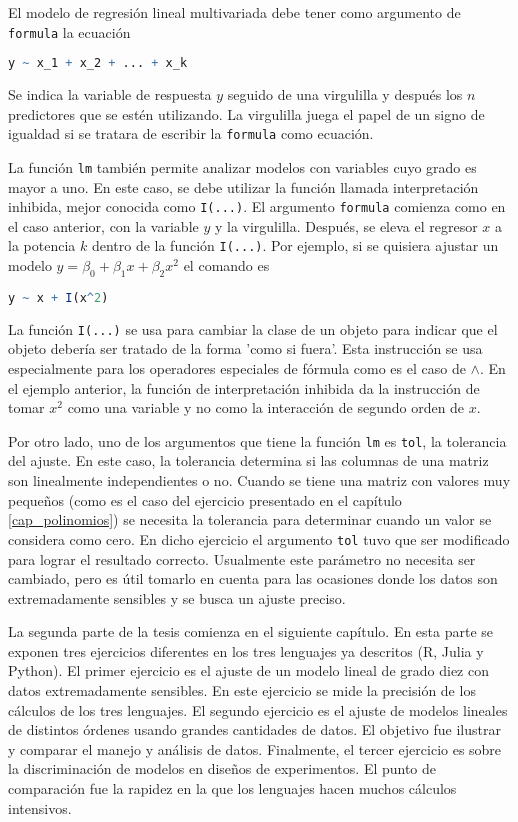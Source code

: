 El modelo de regresión lineal multivariada debe tener como argumento de \texttt{formula} la ecuación 

\begin{lstlisting}[language=R]
	y ~ x_1 + x_2 + ... + x_k
\end{lstlisting}

Se indica la variable de respuesta $y$ seguido de una virgulilla y después los $n$ predictores que se estén utilizando. La virgulilla juega el papel de un signo de igualdad si se tratara de escribir la \texttt{formula} como ecuación.

La función \texttt{lm} también permite analizar modelos con variables cuyo grado es mayor a uno. En este caso, se debe utilizar la función llamada interpretación inhibida, mejor conocida como \texttt{I(...)}. El argumento \texttt{formula} comienza como en el caso anterior, con la variable $y$ y la virgulilla. Después, se eleva el regresor $x$ a la potencia $k$ dentro de la función \texttt{I(...)}. Por ejemplo, si se quisiera ajustar un modelo  $y = \beta_0 + \beta_1 x + \beta_2 x^{2}$ el comando es

\begin{lstlisting}[language=R]
	y ~ x + I(x^2)
\end{lstlisting}

La función \texttt{I(...)} se usa para cambiar la clase de un objeto para indicar que el objeto debería ser tratado de la forma 'como si fuera'. Esta instrucción se usa especialmente para los operadores especiales de fórmula como es el caso de \texttt{$\wedge$}. En el ejemplo anterior, la función de interpretación inhibida da la instrucción de tomar $x^{2}$ como una variable y no como la interacción de segundo orden de $x$. 

Por otro lado, uno de los argumentos que tiene la función \texttt{lm} es \texttt{tol}, la tolerancia del ajuste. En este caso, la tolerancia determina si las columnas de una matriz son linealmente independientes o no. Cuando se tiene una matriz con valores muy pequeños (como es el caso del ejercicio presentado en el capítulo \ref{cap_polinomios}) se necesita la tolerancia para determinar cuando un valor se considera como cero. En dicho ejercicio el argumento \texttt{tol} tuvo que ser modificado para lograr el resultado correcto. Usualmente este parámetro no necesita ser cambiado, pero es útil tomarlo en cuenta para las ocasiones donde los datos son extremadamente sensibles y se busca un ajuste preciso. 

La segunda parte de la tesis comienza en el siguiente capítulo. En esta parte se exponen tres ejercicios diferentes en los tres lenguajes ya descritos (\textsf{R, Julia} y \textsf{Python}). El primer ejercicio es el ajuste de un modelo lineal de grado diez con datos extremadamente sensibles. En este ejercicio se mide la precisión de los cálculos de los tres lenguajes. El segundo ejercicio es el ajuste de modelos lineales de distintos órdenes usando grandes cantidades de datos. El objetivo fue ilustrar y comparar el manejo y análisis de datos. Finalmente, el tercer ejercicio es sobre la discriminación de modelos en diseños de experimentos. El punto de comparación fue la rapidez en la que los lenguajes hacen muchos cálculos intensivos. 


